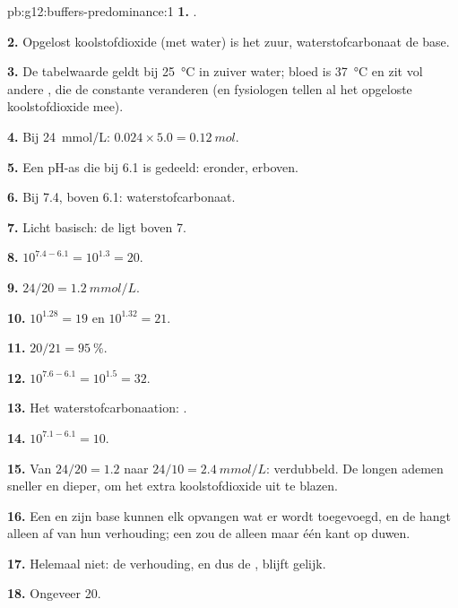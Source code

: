 \begin{solution}{pb:g12:buffers-predominance:1}
\textbf{1.} .

\textbf{2.} Opgelost koolstofdioxide (met water) is het zuur,
waterstofcarbonaat de base.

\textbf{3.} De tabelwaarde geldt bij \qty{25}{\celsius} in zuiver water;
bloed is \qty{37}{\celsius} en zit vol andere , die de constante
veranderen (en fysiologen tellen al het opgeloste koolstofdioxide mee).

\textbf{4.} Bij \qty{24}{mmol/L}: $0.024 \times 5.0 = \qty{0.12}{mol}$.

\textbf{5.} Een pH-as die bij 6.1 is gedeeld:  eronder,
 erboven.

\textbf{6.} Bij 7.4, boven 6.1: waterstofcarbonaat.

\textbf{7.} Licht basisch: de  ligt boven 7.

\textbf{8.} $10^{7.4 - 6.1} = 10^{1.3} = 20$.

\textbf{9.} $24 / 20 = \qty{1.2}{mmol/L}$.

\textbf{10.} $10^{1.28} = 19$ en $10^{1.32} = 21$.

\textbf{11.} $20/21 = \qty{95}{\percent}$.

\textbf{12.} $10^{7.6 - 6.1} = 10^{1.5} = 32$.

\textbf{13.} Het waterstofcarbonaation:
.

\textbf{14.} $10^{7.1 - 6.1} = 10$.

\textbf{15.} Van $24/20 = 1.2$ naar $24/10 = \qty{2.4}{mmol/L}$:
verdubbeld. De longen ademen sneller en dieper, om het extra
koolstofdioxide uit te blazen.

\textbf{16.} Een  en zijn base kunnen elk opvangen wat er wordt
toegevoegd, en de  hangt alleen af van hun verhouding; een 
zou de  alleen maar één kant op duwen.

\textbf{17.} Helemaal niet: de verhouding, en dus de , blijft gelijk.

\textbf{18.} Ongeveer 20.
\end{solution}
